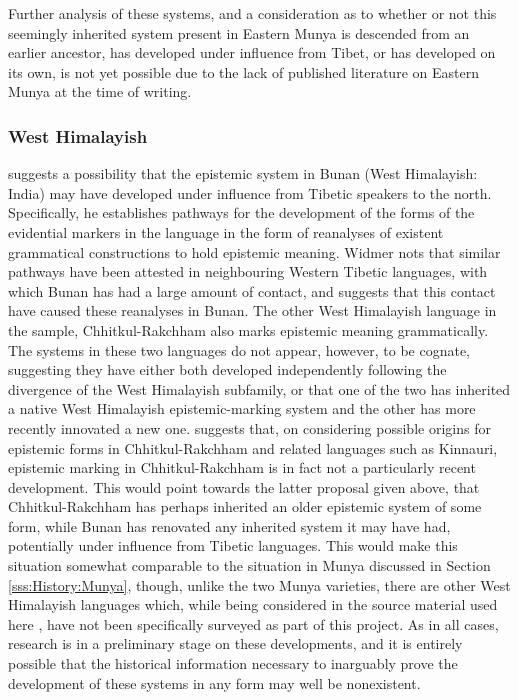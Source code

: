 Further analysis of these systems, and a consideration as to whether or not this seemingly inherited system present in Eastern Munya is descended from an earlier ancestor, has developed under influence from Tibet, or has developed on its own, is not yet possible due to the lack of published literature on Eastern Munya at the time of writing.

\subsubsection{West Himalayish}
 suggests a possibility that the epistemic system in Bunan (West Himalayish: India) may have developed under influence from Tibetic speakers to the north. Specifically, he establishes pathways for the development of the forms of the evidential markers in the language in the form of reanalyses of existent grammatical constructions to hold epistemic meaning. Widmer nots that similar pathways have been attested in neighbouring Western Tibetic languages, with which Bunan has had a large amount of contact, and suggests that this contact have caused these reanalyses in Bunan. The other West Himalayish language in the sample, Chhitkul-Rakchham \cite[West Himalayish: India,][]{Martinez2021} also marks epistemic meaning grammatically. The systems in these two languages do not appear, however, to be cognate, suggesting they have either both developed independently following the divergence of the West Himalayish subfamily, or that one of the two has inherited a native West Himalayish epistemic-marking system and the other has more recently innovated a new one.  suggests that, on considering possible origins for epistemic forms in Chhitkul-Rakchham and related languages such as Kinnauri, epistemic marking in Chhitkul-Rakchham is in fact not a particularly recent development. This would point towards the latter proposal given above, that Chhitkul-Rakchham has perhaps inherited an older epistemic system of some form, while Bunan has renovated any inherited system it may have had, potentially under influence from Tibetic languages. This would make this situation somewhat comparable to the situation in Munya discussed in Section \ref{sss:History:Munya}, though, unlike the two Munya varieties, there are other West Himalayish languages which, while being considered in the source material used here \cites{Widmer2014}{Widmer2017}{Martinez2021}, have not been specifically surveyed as part of this project. As in all cases, research is in a preliminary stage on these developments, and it is entirely possible that the historical information necessary to inarguably prove the development of these systems in any form may well be nonexistent.

